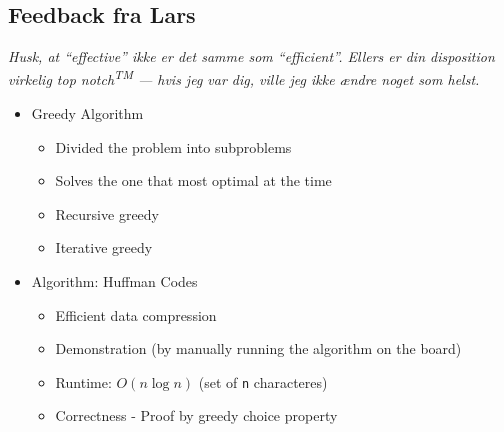 \subsection*{Feedback fra Lars}
\textit{Husk, at “effective” ikke er det samme som “efficient”. Ellers er din
disposition virkelig top notch\textsuperscript{TM} — hvis jeg var dig, ville
jeg ikke ændre noget som helst.}

\begin{itemize}
    \item Greedy Algorithm
    \begin{itemize}
        \item Divided the problem into subproblems
        \item Solves the one that most optimal at the time
        \item Recursive greedy
        \item Iterative greedy
    \end{itemize}
    \item Algorithm: Huffman Codes
    \begin{itemize}
        \item Efficient data compression
        \item Demonstration (by manually running the algorithm on the board)
        \item Runtime: $O(n\log n)$ (set of \texttt{n} characteres)
        \item Correctness - Proof by greedy choice property
    \end{itemize}\iffalse
    \item Perspective: Activity selection problem (also a greedy algorithm)\fi
\end{itemize}
